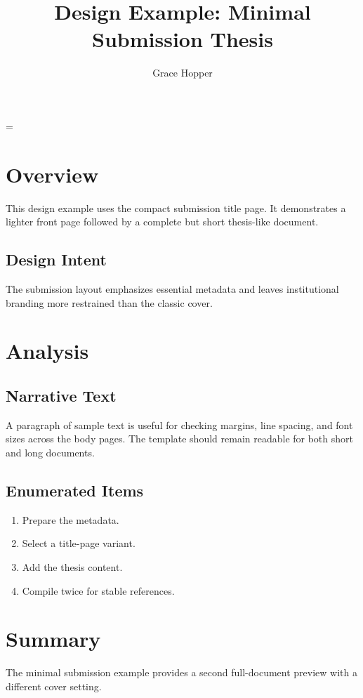 \documentclass[12pt,a4paper]{../../../cau_thesis/cau_thesis}
\title{Design Example: Minimal Submission Thesis}
\author{Grace Hopper}
\institute{Institute of Informatics}
\begin{document}
\sloppy
\hfuzz=\maxdimen
{}

\hypersetup{pageanchor=true}
\tableofcontents
\clearpage
{}

\chapter{Overview}
This design example uses the compact submission title page. It demonstrates a
lighter front page followed by a complete but short thesis-like document.

\section{Design Intent}
The submission layout emphasizes essential metadata and leaves institutional
branding more restrained than the classic cover.

\chapter{Analysis}
\section{Narrative Text}
A paragraph of sample text is useful for checking margins, line spacing, and
font sizes across the body pages. The template should remain readable for both
short and long documents.

\section{Enumerated Items}
\begin{enumerate}
  \item Prepare the metadata.
  \item Select a title-page variant.
  \item Add the thesis content.
  \item Compile twice for stable references.
\end{enumerate}

\chapter{Summary}
The minimal submission example provides a second full-document preview with a
different cover setting.
\end{document}
